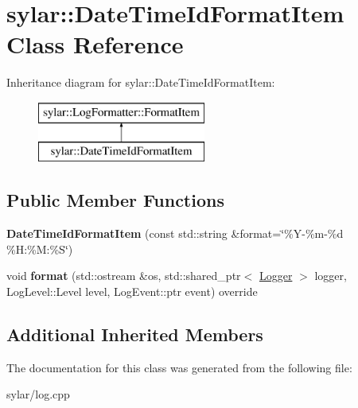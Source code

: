\hypertarget{classsylar_1_1DateTimeIdFormatItem}{\section{sylar\-:\-:Date\-Time\-Id\-Format\-Item Class Reference}
\label{classsylar_1_1DateTimeIdFormatItem}
}
Inheritance diagram for sylar\-:\-:Date\-Time\-Id\-Format\-Item\-:\begin{figure}[H]
\begin{center}
\leavevmode
\includegraphics[height=2.000000cm]{classsylar_1_1DateTimeIdFormatItem}
\end{center}
\end{figure}
\subsection*{Public Member Functions}
\begin{DoxyCompactItemize}
\item 
\hypertarget{classsylar_1_1DateTimeIdFormatItem_a5c96a9d1e66b89f6bce2aeed8589b5e0}{{\bfseries Date\-Time\-Id\-Format\-Item} (const std\-::string \&format=\char`\"{}\%Y-\/\%m-\/\%d \%H\-:\%M\-:\%S\char`\"{})}\label{classsylar_1_1DateTimeIdFormatItem_a5c96a9d1e66b89f6bce2aeed8589b5e0}

\item 
\hypertarget{classsylar_1_1DateTimeIdFormatItem_a748822c07220983ef1bfa4534da80d37}{void {\bfseries format} (std\-::ostream \&os, std\-::shared\-\_\-ptr$<$ \hyperlink{classsylar_1_1Logger}{Logger} $>$ logger, Log\-Level\-::\-Level level, Log\-Event\-::ptr event) override}\label{classsylar_1_1DateTimeIdFormatItem_a748822c07220983ef1bfa4534da80d37}

\end{DoxyCompactItemize}
\subsection*{Additional Inherited Members}


The documentation for this class was generated from the following file\-:\begin{DoxyCompactItemize}
\item 
sylar/log.\-cpp\end{DoxyCompactItemize}
